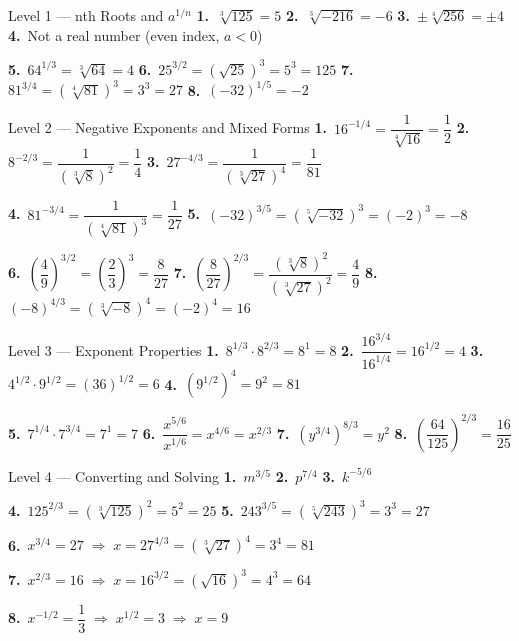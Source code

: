 \documentclass[12pt]{article}
\begin{document}
\begin{solutionbox}{Level 1 --- nth Roots and $a^{1/n}$}
\textbf{1.}~$\sqrt[3]{125}=5$\quad
\textbf{2.}~$\sqrt[3]{-216}=-6$\quad
\textbf{3.}~$\pm\sqrt[4]{256}=\pm4$\quad
\textbf{4.}~Not a real number (even index, $a<0$)

\medskip
\textbf{5.}~$64^{1/3}=\sqrt[3]{64}=4$\quad
\textbf{6.}~$25^{3/2}=(\sqrt{25})^3=5^3=125$\quad
\textbf{7.}~$81^{3/4}=(\sqrt[4]{81})^3=3^3=27$\quad
\textbf{8.}~$(-32)^{1/5}=-2$
\end{solutionbox}

\begin{solutionbox}{Level 2 --- Negative Exponents and Mixed Forms}
\textbf{1.}~$16^{-1/4}=\dfrac{1}{\sqrt[4]{16}}=\dfrac{1}{2}$\quad
\textbf{2.}~$8^{-2/3}=\dfrac{1}{(\sqrt[3]{8})^2}=\dfrac{1}{4}$\quad
\textbf{3.}~$27^{-4/3}=\dfrac{1}{(\sqrt[3]{27})^4}=\dfrac{1}{81}$

\medskip
\textbf{4.}~$81^{-3/4}=\dfrac{1}{(\sqrt[4]{81})^3}=\dfrac{1}{27}$\quad
\textbf{5.}~$(-32)^{3/5}=(\sqrt[5]{-32})^3=(-2)^3=-8$

\medskip
\textbf{6.}~$\left(\dfrac{4}{9}\right)^{3/2}=\left(\dfrac{2}{3}\right)^3=\dfrac{8}{27}$\quad
\textbf{7.}~$\left(\dfrac{8}{27}\right)^{2/3}=\dfrac{(\sqrt[3]{8})^2}{(\sqrt[3]{27})^2}=\dfrac{4}{9}$\quad
\textbf{8.}~$(-8)^{4/3}=(\sqrt[3]{-8})^4=(-2)^4=16$
\end{solutionbox}

\begin{solutionbox}{Level 3 --- Exponent Properties}
\textbf{1.}~$8^{1/3}\cdot8^{2/3}=8^1=8$\quad
\textbf{2.}~$\dfrac{16^{3/4}}{16^{1/4}}=16^{1/2}=4$\quad
\textbf{3.}~$4^{1/2}\cdot9^{1/2}=(36)^{1/2}=6$\quad
\textbf{4.}~$(9^{1/2})^4=9^2=81$

\medskip
\textbf{5.}~$7^{1/4}\cdot7^{3/4}=7^1=7$\quad
\textbf{6.}~$\dfrac{x^{5/6}}{x^{1/6}}=x^{4/6}=x^{2/3}$\quad
\textbf{7.}~$(y^{3/4})^{8/3}=y^2$\quad
\textbf{8.}~$\left(\dfrac{64}{125}\right)^{2/3}=\dfrac{16}{25}$
\end{solutionbox}

\begin{solutionbox}{Level 4 --- Converting and Solving}
\textbf{1.}~$m^{3/5}$\quad
\textbf{2.}~$p^{7/4}$\quad
\textbf{3.}~$k^{-5/6}$

\medskip
\textbf{4.}~$125^{2/3}=(\sqrt[3]{125})^2=5^2=25$\quad
\textbf{5.}~$243^{3/5}=(\sqrt[5]{243})^3=3^3=27$

\medskip
\textbf{6.}~$x^{3/4}=27\;\Rightarrow\;x=27^{4/3}=(\sqrt[3]{27})^4=3^4=81$

\textbf{7.}~$x^{2/3}=16\;\Rightarrow\;x=16^{3/2}=(\sqrt{16})^3=4^3=64$

\textbf{8.}~$x^{-1/2}=\dfrac{1}{3}\;\Rightarrow\;x^{1/2}=3\;\Rightarrow\;x=9$
\end{solutionbox}
\end{document}
